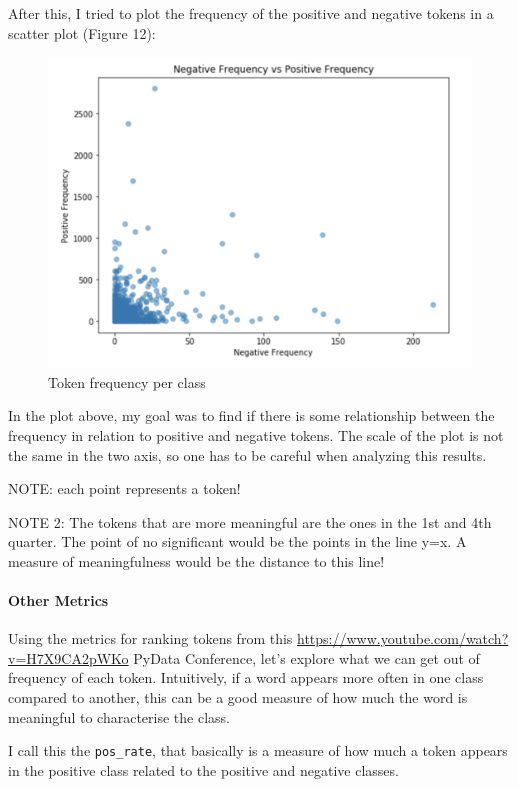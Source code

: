 \documentclass{article}
\begin{document}
	After this, I tried to plot the frequency of the positive and negative tokens in a scatter plot (Figure 12):
	
	\begin{figure}[h]
		\label{Figure 12}
		\caption{Token frequency per class}
		\includegraphics[scale=0.55]{neg_post_freq.png}
		\centering
	\end{figure}

	In the plot above, my goal was to find if there is some relationship between the frequency in relation to positive and negative tokens. The scale of the plot is not the same in the two axis, so one has to be careful when analyzing this results.

NOTE: each point represents a token!

NOTE 2: The tokens that are more meaningful are the ones in the 1st and 4th quarter. The point of no significant would be the points in the line y=x. A measure of meaningfulness would be the distance to this line!

\paragraph{Other Metrics}


Using the metrics for ranking tokens from this \url{https://www.youtube.com/watch?v=H7X9CA2pWKo} PyData Conference, let’s explore what we can get out of frequency of each token. Intuitively, if a word appears more often in one class compared to another, this can be a good measure of how much the word is meaningful to characterise the class.

I call this the \texttt{pos\_rate}, that basically is a measure of how much a token appears in the positive class related to the positive and negative classes.
\end{document}

